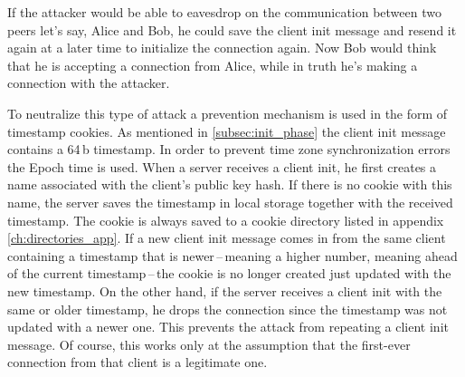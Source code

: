 If the attacker would be able to eavesdrop on the communication between two peers let's say, Alice and Bob, he could save the client init message and resend it again at a later time to initialize the connection again. Now Bob would think that he is accepting a connection from Alice, while in truth he's making a connection with the attacker.

To neutralize this type of attack a prevention mechanism is used in the form of timestamp cookies. As mentioned in \ref{subsec:init_phase} the client init message contains a 64\,b timestamp. In order to prevent time zone synchronization errors the Epoch time is used. When a server receives a client init, he first creates a name associated with the client's public key hash. If there is no cookie with this name, the server saves the timestamp in local storage together with the received timestamp. The cookie is always saved to a cookie directory listed in appendix \ref{ch:directories_app}. If a new client init message comes in from the same client containing a timestamp that is newer\,--\,meaning a higher number, meaning ahead of the current timestamp\,--\,the cookie is no longer created just updated with the new timestamp. On the other hand, if the server receives a client init with the same or older timestamp, he drops the connection since the timestamp was not updated with a newer one. This prevents the attack from repeating a client init message. Of course, this works only at the assumption that the first-ever connection from that client is a legitimate one.
